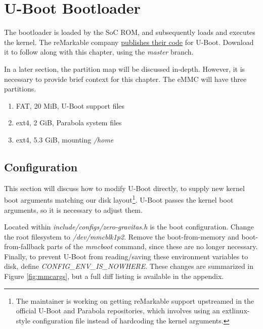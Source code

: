 \documentclass{memoir}
\begin{document}
\chapter{U-Boot Bootloader}
The bootloader is loaded by the SoC ROM, and subsequently loads and executes the kernel. The reMarkable company \href{https://github.com/remarkable/uboot/}{publishes their code} for U-Boot. Download it to follow along with this chapter, using the \textit{master} branch.

In a later section, the partition map will be discussed in-depth. However, it is necessary to provide brief context for this chapter. The eMMC will have three partitions.

\begin{enumerate}
\item{FAT, 20 MiB, U-Boot support files}
\item{ext4, 2 GiB, Parabola system files}
\item{ext4, 5.3 GiB, mounting \textit{/home}}
\end{enumerate}

\section{Configuration}
This section will discuss how to modify U-Boot directly, to supply new kernel boot arguments matching our disk layout\footnote{The maintainer is working on getting reMarkable support upstreamed in the official U-Boot and Parabola repositories, which involves using an extlinux-style configuration file instead of hardcoding the kernel arguments.}.
U-Boot passes the kernel boot arguments, so it is necessary to adjust them.

Located within \textit{include/configs/zero-gravitas.h} is the boot configuration. Change the root filesystem to \textit{/dev/mmcblk1p2}. Remove the boot-from-memory and boot-from-fallback parts of the \textit{mmcboot} command, since these are no longer necessary. Finally, to prevent U-Boot from reading/saving these environment variables to disk, define \textit{CONFIG\_ENV\_IS\_NOWHERE}. These changes are summarized in Figure \ref{fig:mmcargs}, but a full diff listing is available in the  appendix.
\end{document}

